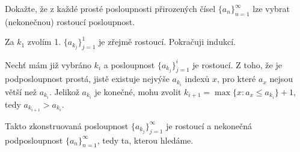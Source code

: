 \documentclass[12pt]{article}					%
\begin{document}
\begin{priklad}
        Dokažte, že z každé prosté posloupnosti přirozených čísel $\{a_n\}_{n = 1}^∞$ lze vybrat (nekonečnou) rostoucí posloupnost.

    \begin{reseni}
            Za $k_1$ zvolím 1. $\{a_{k_j}\}_{j=1}^1$ je zřejmě rostoucí. Pokračuji indukcí.

        Nechť mám již vybráno $k_i$ a posloupnost $\{a_{k_j}\}_{j = 1}^i$ je rostoucí. Z toho, že je podposloupnost prostá, jistě existuje nejvýše $a_{k_i}$ indexů $x$, pro které $a_x$ nejsou větší než $a_{k_i}$. Jelikož $a_{k_i}$ je konečné, mohu zvolit $k_{i+1}=\max\{x: a_x ≤ a_{k_i}\} + 1$, tedy $a_{k_{i+1}}> a_{k_i}$.

        Takto zkonstruovaná posloupnost $\{a_{k_j}\}_{j=1}^∞$ je rostoucí a nekonečná podposloupnost $\{a_n\}_{n = 1}^∞$, tedy ta, kterou hledáme.
    \end{reseni}
\end{priklad}
\end{document}
